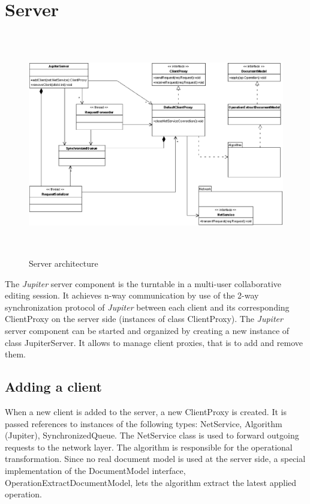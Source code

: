 \section{Server}
\begin{figure}[H]
\centering
\includegraphics[height=9.8cm,width=15.36cm]{../../images/algo-impl/server_diagram.eps}
\caption{Server architecture}
\label{Server architecture}
\end{figure}

The \emph{Jupiter} server component is the turntable in a multi-user collaborative editing session. It achieves n-way communication by use of the 2-way synchronization protocol of \emph{Jupiter} between each client and its corresponding ClientProxy on the server side (instances of class ClientProxy). The \emph{Jupiter} server component can be started and organized by creating a new instance of class JupiterServer. It allows to manage client proxies, that is to add and remove them.

\subsection{Adding a client}
When a new client is added to the server, a new ClientProxy is created. It is passed references to instances of the following types: NetService, Algorithm (Jupiter), SynchronizedQueue. The NetService class is used to forward outgoing requests to the network layer. The algorithm is responsible for the operational transformation. Since no real document model is used at the server side, a special implementation of the DocumentModel interface, OperationExtractDocumentModel, lets the algorithm extract the latest applied operation.

